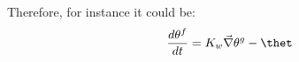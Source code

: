 Therefore, for instance it could be:
\begin{equation}
\frac{d \theta^f}{dt} = K_w \vec{\nabla}{\theta^g - \thet}
\end{equation}